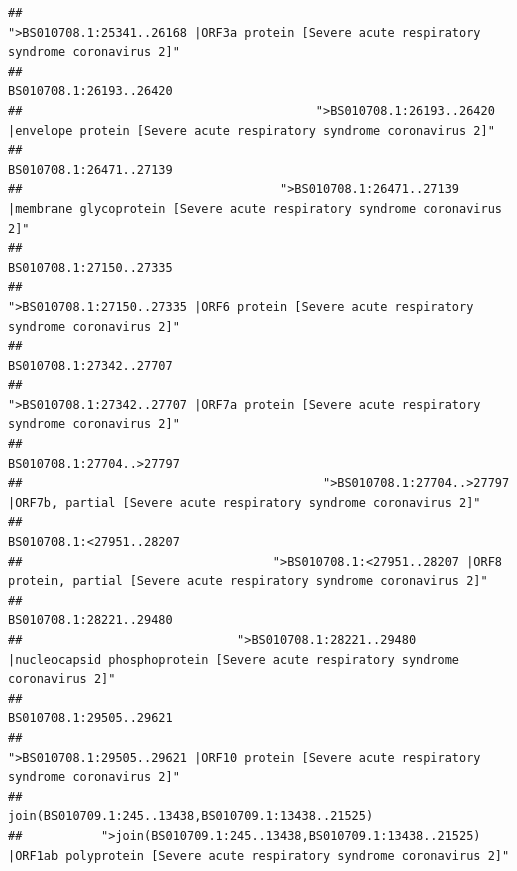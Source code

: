 \documentclass[
]{article}
\begin{document}
\begin{verbatim}
##                                            ">BS010708.1:25341..26168 |ORF3a protein [Severe acute respiratory syndrome coronavirus 2]" 
##                                                                                                                BS010708.1:26193..26420 
##                                         ">BS010708.1:26193..26420 |envelope protein [Severe acute respiratory syndrome coronavirus 2]" 
##                                                                                                                BS010708.1:26471..27139 
##                                    ">BS010708.1:26471..27139 |membrane glycoprotein [Severe acute respiratory syndrome coronavirus 2]" 
##                                                                                                                BS010708.1:27150..27335 
##                                             ">BS010708.1:27150..27335 |ORF6 protein [Severe acute respiratory syndrome coronavirus 2]" 
##                                                                                                                BS010708.1:27342..27707 
##                                            ">BS010708.1:27342..27707 |ORF7a protein [Severe acute respiratory syndrome coronavirus 2]" 
##                                                                                                               BS010708.1:27704..>27797 
##                                          ">BS010708.1:27704..>27797 |ORF7b, partial [Severe acute respiratory syndrome coronavirus 2]" 
##                                                                                                               BS010708.1:<27951..28207 
##                                   ">BS010708.1:<27951..28207 |ORF8 protein, partial [Severe acute respiratory syndrome coronavirus 2]" 
##                                                                                                                BS010708.1:28221..29480 
##                              ">BS010708.1:28221..29480 |nucleocapsid phosphoprotein [Severe acute respiratory syndrome coronavirus 2]" 
##                                                                                                                BS010708.1:29505..29621 
##                                            ">BS010708.1:29505..29621 |ORF10 protein [Severe acute respiratory syndrome coronavirus 2]" 
##                                                                                    join(BS010709.1:245..13438,BS010709.1:13438..21525) 
##           ">join(BS010709.1:245..13438,BS010709.1:13438..21525) |ORF1ab polyprotein [Severe acute respiratory syndrome coronavirus 2]" 

\end{verbatim}
\end{document}
